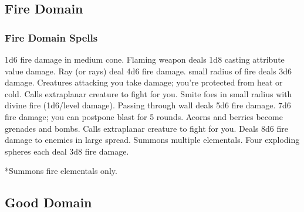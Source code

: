 \subsection{Fire Domain}

\subsubsection{Fire Domain Spells}
\begin{spelllist}
   1d6 fire damage in medium cone.
  \spellhead[1]{}
   Flaming weapon deals 1d8 \add casting attribute value damage.
   Ray (or rays) deal 4d6 fire damage.
  \spellhead[3]{}
   small radius of fire deals 3d6 damage.
   Creatures attacking you take damage; you're protected from heat or cold.
   Calls extraplanar creature to fight for you.
   Smite foes in small radius with divine fire (1d6/level damage).
   Passing through wall deals 5d6 fire damage.
   7d6 fire damage; you can postpone blast for 5 rounds.
   Acorns and berries become grenades and bombs.
  \spellhead[7]{}
   Calls extraplanar creature to fight for you.
   Deals 8d6 fire damage to enemies in large spread.
   Summons multiple elementals.
   Four exploding spheres each deal 3d8 fire damage.
\end{spelllist}
*Summons fire elementals only.

\subsection{Good Domain}
